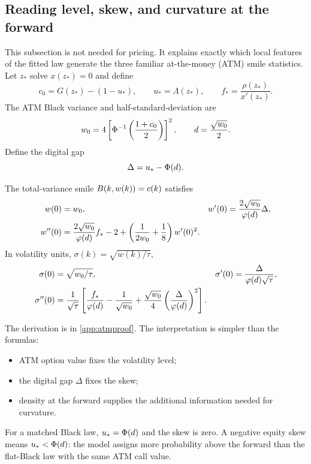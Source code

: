 \subsection{Reading level, skew, and curvature at the forward}

This subsection is not needed for pricing.  It explains exactly which local
features of the fitted law generate the three familiar at-the-money (ATM)
smile statistics.  Let $z_*$ solve $x(z_*)=0$ and define
\begin{equation}
c_0=G(z_*)-(1-u_*),\qquad
u_*=\Lambda(z_*),\qquad
f_*=\frac{\rho(z_*)}{x'(z_*)}.
\label{eq:atm_inputs}
\end{equation}
The ATM Black variance and half-standard-deviation are
\[
w_0=4\left[\Phi^{-1}\left(\frac{1+c_0}{2}\right)\right]^2,
\qquad d=\frac{\sqrt{w_0}}2.
\]
Define the digital gap
\begin{equation}
\Delta=u_*-\Phi(d).
\label{eq:digitalgap}
\end{equation}

\begin{proposition}
\label{prop:atm}
The total-variance smile $B(k,w(k))=c(k)$ satisfies
\begin{align}
w(0)&=w_0,
&w'(0)&=\frac{2\sqrt{w_0}}{\varphi(d)}\Delta,
\label{eq:atm_w}\\
w''(0)&=\frac{2\sqrt{w_0}}{\varphi(d)}f_*-2
+\left(\frac1{2w_0}+\frac18\right)w'(0)^2.
\label{eq:atm_wpp}
\end{align}
In volatility units, $\sigma(k)=\sqrt{w(k)/\tau}$,
\begin{align}
\sigma(0)&=\sqrt{w_0/\tau},
&\sigma'(0)&=\frac{\Delta}{\varphi(d)\sqrt\tau},
\label{eq:atm_sigma1}\\
\sigma''(0)&=\frac1{\sqrt\tau}
\left[\frac{f_*}{\varphi(d)}-\frac1{\sqrt{w_0}}
+\frac{\sqrt{w_0}}4\left(\frac{\Delta}{\varphi(d)}\right)^2\right].
\label{eq:atm_sigma}
\end{align}
\end{proposition}

The derivation is in \cref{app:atmproof}.  The interpretation is simpler than
the formulas:
\begin{itemize}
\item ATM option value fixes the volatility level;
\item the digital gap $\Delta$ fixes the skew;
\item density at the forward supplies the additional information needed for
curvature.
\end{itemize}
For a matched Black law, $u_*=\Phi(d)$ and the skew is zero.  A negative
equity skew means $u_*<\Phi(d)$: the model assigns more probability above
the forward than the flat-Black law with the same ATM call value.


